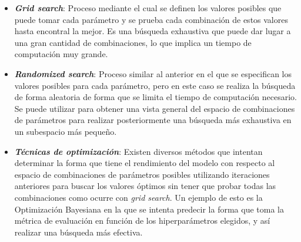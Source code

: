 \begin{itemize}
    \item \textbf{\textit{Grid search}}: Proceso mediante el cual se definen los
    valores posibles que puede tomar cada parámetro y se prueba cada combinación
    de estos valores hasta encontral la mejor. Es una búsqueda exhaustiva que
    puede dar lugar a una gran cantidad de combinaciones, lo que implica un
    tiempo de computación muy grande.
    \item \textbf{\textit{Randomized search}}: Proceso similar al anterior en el
    que se especifican los valores posibles para cada parámetro, pero en este
    caso se realiza la búsqueda de forma aleatoria de forma que se limita el
    tiempo de computación necesario. Se puede utilizar para obtener una vista
    general del espacio de combinaciones de parámetros para realizar
    posteriormente una búsqueda más exhaustiva en un subespacio más pequeño.
    \item \textbf{\textit{Técnicas de optimización}}: Existen diversos métodos
    que intentan determinar la forma que tiene el rendimiento del modelo con
    respecto al espacio de combinaciones de parámetros posibles utilizando
    iteraciones anteriores para buscar los valores óptimos sin tener que probar
    todas las combinaciones como ocurre con \textit{grid search}. Un ejemplo de
    esto es la Optimización Bayesiana \cite{wu2019hyperparameter} en la que se
    intenta predecir la forma que toma la métrica de evaluación en función de
    los hiperparámetros elegidos, y así realizar una búsqueda más efectiva.
\end{itemize}
